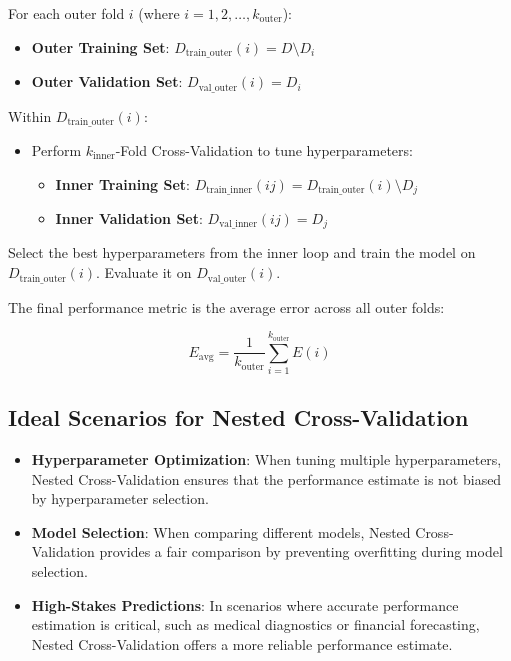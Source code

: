 \documentclass[10pt]{article}
\begin{document}
For each outer fold \(i\) (where \(i = 1, 2, \dots, k_{\text{outer}}\)):

\begin{itemize}
    \item \textbf{Outer Training Set}: \(D_{\text{train\_outer}}(i) = D \setminus D_i\)
    \item \textbf{Outer Validation Set}: \(D_{\text{val\_outer}}(i) = D_i\)
\end{itemize}

Within \(D_{\text{train\_outer}}(i)\):

\begin{itemize}
    \item Perform \(k_{\text{inner}}\)-Fold Cross-Validation to tune hyperparameters:
    \begin{itemize}
        \item \textbf{Inner Training Set}: \(D_{\text{train\_inner}}(ij) = D_{\text{train\_outer}}(i) \setminus D_j\)
        \item \textbf{Inner Validation Set}: \(D_{\text{val\_inner}}(ij) = D_j\)
    \end{itemize}
\end{itemize}

Select the best hyperparameters from the inner loop and train the model on \(D_{\text{train\_outer}}(i)\). Evaluate it on \(D_{\text{val\_outer}}(i)\).

The final performance metric is the average error across all outer folds:

\[
E_{\text{avg}} = \frac{1}{k_{\text{outer}}} \sum_{i=1}^{k_{\text{outer}}} E(i)
\]

\subsection{Ideal Scenarios for Nested Cross-Validation}
\begin{itemize}
    \item \textbf{Hyperparameter Optimization}: When tuning multiple hyperparameters, Nested Cross-Validation ensures that the performance estimate is not biased by hyperparameter selection.
    \item \textbf{Model Selection}: When comparing different models, Nested Cross-Validation provides a fair comparison by preventing overfitting during model selection.
    \item \textbf{High-Stakes Predictions}: In scenarios where accurate performance estimation is critical, such as medical diagnostics or financial forecasting, Nested Cross-Validation offers a more reliable performance estimate.
\end{itemize}
\end{document}
